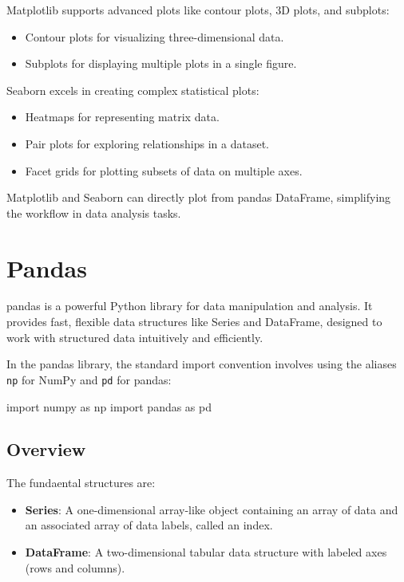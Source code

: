 Matplotlib supports advanced plots like contour plots, 3D plots, and subplots:
\begin{itemize}
    \item Contour plots for visualizing three-dimensional data.
    \item Subplots for displaying multiple plots in a single figure.
\end{itemize}

Seaborn excels in creating complex statistical plots:
\begin{itemize}
    \item Heatmaps for representing matrix data.
    \item Pair plots for exploring relationships in a dataset.
    \item Facet grids for plotting subsets of data on multiple axes.
\end{itemize}
Matplotlib and Seaborn can directly plot from pandas DataFrame, simplifying the workflow in data
analysis tasks.



\section{Pandas}

pandas is a powerful Python library for data manipulation and analysis. It provides fast, flexible
data structures like Series and DataFrame, designed to work with structured data intuitively and
efficiently.

In the pandas library, the standard import convention involves using the aliases \texttt{np} for NumPy and \texttt{pd} for pandas:

\begin{codeblock}[language=python]
    import numpy as np
    import pandas as pd
\end{codeblock}

\subsection{Overview}

The fundaental structures are:
\begin{itemize}
    \item \textbf{Series}: A one-dimensional array-like object containing an array of data and an associated array of data labels, called an index.
    \item \textbf{DataFrame}: A two-dimensional tabular data structure with labeled axes (rows and columns).
\end{itemize}

